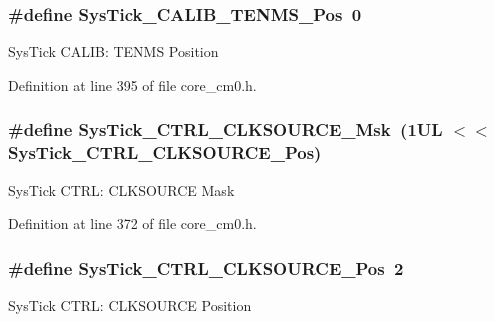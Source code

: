 \subsubsection[{\texorpdfstring{Sys\+Tick\+\_\+\+C\+A\+L\+I\+B\+\_\+\+T\+E\+N\+M\+S\+\_\+\+Pos}{SysTick_CALIB_TENMS_Pos}}]{\setlength{\rightskip}{0pt plus 5cm}\#define Sys\+Tick\+\_\+\+C\+A\+L\+I\+B\+\_\+\+T\+E\+N\+M\+S\+\_\+\+Pos~0}\hypertarget{group___c_m_s_i_s___sys_tick_gacae558f6e75a0bed5d826f606d8e695e}{}\label{group___c_m_s_i_s___sys_tick_gacae558f6e75a0bed5d826f606d8e695e}
Sys\+Tick C\+A\+L\+IB\+: T\+E\+N\+MS Position 

Definition at line 395 of file core\+\_\+cm0.\+h.

\subsubsection[{\texorpdfstring{Sys\+Tick\+\_\+\+C\+T\+R\+L\+\_\+\+C\+L\+K\+S\+O\+U\+R\+C\+E\+\_\+\+Msk}{SysTick_CTRL_CLKSOURCE_Msk}}]{\setlength{\rightskip}{0pt plus 5cm}\#define Sys\+Tick\+\_\+\+C\+T\+R\+L\+\_\+\+C\+L\+K\+S\+O\+U\+R\+C\+E\+\_\+\+Msk~(1\+U\+L $<$$<$ Sys\+Tick\+\_\+\+C\+T\+R\+L\+\_\+\+C\+L\+K\+S\+O\+U\+R\+C\+E\+\_\+\+Pos)}\hypertarget{group___c_m_s_i_s___sys_tick_gaa41d06039797423a46596bd313d57373}{}\label{group___c_m_s_i_s___sys_tick_gaa41d06039797423a46596bd313d57373}
Sys\+Tick C\+T\+RL\+: C\+L\+K\+S\+O\+U\+R\+CE Mask 

Definition at line 372 of file core\+\_\+cm0.\+h.

\subsubsection[{\texorpdfstring{Sys\+Tick\+\_\+\+C\+T\+R\+L\+\_\+\+C\+L\+K\+S\+O\+U\+R\+C\+E\+\_\+\+Pos}{SysTick_CTRL_CLKSOURCE_Pos}}]{\setlength{\rightskip}{0pt plus 5cm}\#define Sys\+Tick\+\_\+\+C\+T\+R\+L\+\_\+\+C\+L\+K\+S\+O\+U\+R\+C\+E\+\_\+\+Pos~2}\hypertarget{group___c_m_s_i_s___sys_tick_ga24fbc69a5f0b78d67fda2300257baff1}{}\label{group___c_m_s_i_s___sys_tick_ga24fbc69a5f0b78d67fda2300257baff1}
Sys\+Tick C\+T\+RL\+: C\+L\+K\+S\+O\+U\+R\+CE Position 

